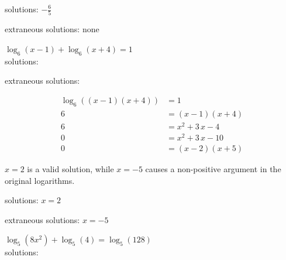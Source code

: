 \documentclass[11pt]{exam}
\begin{document}
\begin{questions}
\begin{solution}
solutions: \(\boxed{ -\frac{6}{5} }\)

extraneous solutions: \(\boxed{ \text{none} }\)
\end{solution}

\label{exact-startocg}

\newpage


\question[6] \(\displaystyle{ \log_{6}(x - 1) + \log_{6}(x + 4) = 1 }\)\\

         solutions: \fillin[][2in]\\\vspace{12pt}
        
         extraneous solutions: \fillin[][2in]\\
\begin{solution}
\[\begin{aligned} \log_{6}((x - 1)(x + 4)) &= 1 \\ 6 &= (x - 1)(x + 4) \\ 6 &= x^{2} + 3 \, x - 4 \\ 0 &= x^{2} + 3 \, x - 10 \\ 0 &= (x - 2)(x + 5) \end{aligned}\]

 \(x = 2\) is a valid solution, while \(x = -5\) causes a non-positive argument in the original logarithms. 

solutions: \(\boxed{ x = 2 }\)

extraneous solutions: \(\boxed{ x = -5 }\)
\end{solution}

\label{exact-endocgextra}

\newpage


\question[6] \(\displaystyle{ \log_{5}(8x^2) + \log_{5}(4) = \log_{5}(128) }\)\\

         solutions: \fillin[][2in]\\\vspace{12pt}
        

\end{questions}
\end{document}
